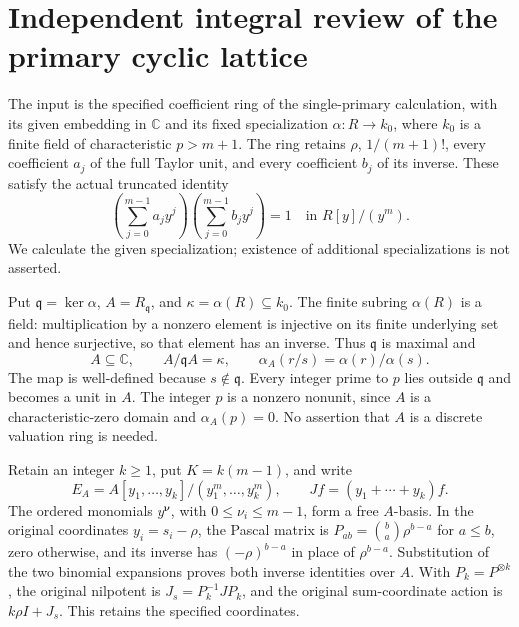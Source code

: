 \section{Independent integral review of the primary cyclic lattice}
\label{sec:pclr}

The input is the specified coefficient ring of the single-primary
calculation, with its given embedding in \(\mathbb C\) and its fixed
specialization \(\alpha:R\to k_0\), where \(k_0\) is a finite field of
characteristic \(p>m+1\). The ring retains \(\rho\), \(1/(m+1)!\), every
coefficient \(a_j\) of the full Taylor unit, and every coefficient
\(b_j\) of its inverse. These satisfy the actual truncated identity
\[
 \left(\sum_{j=0}^{m-1}a_jy^j\right)
 \left(\sum_{j=0}^{m-1}b_jy^j\right)=1\quad\text{in }R[y]/(y^m).
 \tag{PCLR.1}
\]
We calculate the given specialization; existence of additional
specializations is not asserted.

Put \(\mathfrak q=\ker\alpha\), \(A=R_{\mathfrak q}\), and
\(\kappa=\alpha(R)\subseteq k_0\). The finite subring \(\alpha(R)\)
is a field: multiplication by a nonzero element is injective on its
finite underlying set and hence surjective, so that element has an
inverse. Thus \(\mathfrak q\) is maximal and
\[
 A\subseteq\mathbb C,\qquad
 A/\mathfrak qA=\kappa,\qquad
 \alpha_A(r/s)=\alpha(r)/\alpha(s).
 \tag{PCLR.2}
\]
The map is well-defined because \(s\notin\mathfrak q\). Every integer
prime to \(p\) lies outside \(\mathfrak q\) and becomes a unit in
\(A\). The integer \(p\) is a nonzero nonunit, since \(A\) is a
characteristic-zero domain and \(\alpha_A(p)=0\). No assertion that
\(A\) is a discrete valuation ring is needed.

Retain an integer \(k\geq1\), put \(K=k(m-1)\), and write
\[
 E_A=A[y_1,\ldots,y_k]/(y_1^m,\ldots,y_k^m),\qquad
 Jf=(y_1+\cdots+y_k)f.
 \tag{PCLR.3}
\]
The ordered monomials \(y^{\boldsymbol\nu}\), with
\(0\leq\nu_i\leq m-1\), form a free \(A\)-basis. In the original
coordinates \(y_i=s_i-\rho\), the Pascal matrix is
\(P_{ab}=\binom ba\rho^{b-a}\) for \(a\leq b\), zero otherwise,
and its inverse has \((-\rho)^{b-a}\) in place of \(\rho^{b-a}\).
Substitution of the two binomial expansions proves both inverse
identities over \(A\). With \(P_k=P^{\otimes k}\), the original
nilpotent is \(J_s=P_k^{-1}JP_k\), and the original sum-coordinate
action is \(k\rho I+J_s\). This retains the specified coordinates.

